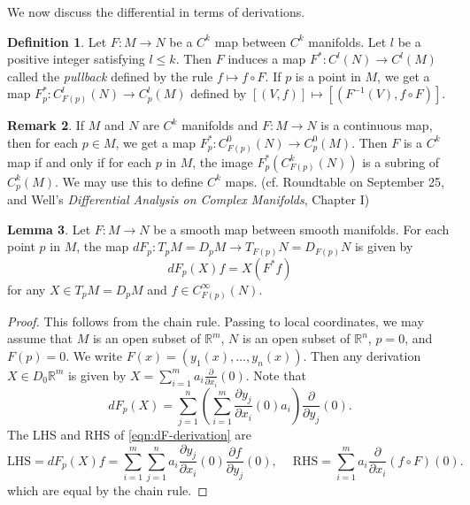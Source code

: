 \documentclass{amsart}
\numberwithin{equation}{section}
\newcommand{\bR}{\mathbb{R}}
\theoremstyle{definition}
\newtheorem{definition}{Definition} [section]
\newtheorem{remark}[definition]{Remark}
\theoremstyle{theorem}
\newtheorem{lemma}[definition]{Lemma}
\begin{document}
We now discuss the differential in terms of derivations. 

\begin{definition}
Let $F: M \to N$ be a $C^k$ map between $C^k$ manifolds. Let $l$ be a positive integer satisfying $l \le k$. 
Then $F$ induces a map $F^* : C^l(N) \to C^l(M)$ called the {\em pullback}  defined by the rule $f \mapsto  f \circ F$. 
If $p$ is a point in $M$, we get a map $F_p^* : C_{F(p)}^l(N) \to C_p^l(M)$ defined by $[(V,f)] \mapsto [(F^{-1}(V),  f \circ F)]$. 
\end{definition}

\begin{remark}
If $M$ and $N$ are $C^k$ manifolds and $F:M \to N$ is a continuous map, then for each $p \in M$, we get a map 
$F^*_p : C^0_{F(p)}(N) \to C^0_p(M)$. Then $F$ is a $C^k$ map if and only if for each $p$ in $M$, 
the image $F_p^*(C^k_{F(p)}(N))$ is a subring of $C_p^k(M)$. We may use this to define $C^k$ maps. 
(cf. Roundtable on September 25, and Well's {\em Differential Analysis on Complex Manifolds}, Chapter I)
\end{remark}

\begin{lemma} \label{dF-derivation}
Let $F : M \to N$ be a smooth map between smooth manifolds. For each point $p$ in $M$, the map 
$dF_p : T_pM= D_pM \to T_{F(p)}N= D_{F(p)}N$ is given by 
\begin{equation}\label{eqn:dF-derivation}
dF_p(X)f = X(F^*f)
\end{equation}
for any $X \in T_pM= D_pM$ and $f \in C^\infty_{F(p)}(N)$. 
\end{lemma}

\begin{proof}
This follows from the chain rule. Passing to local coordinates, we may assume that $M$ is an open subset of $\mathbb{R}^m$,  
$N$ is an open subset of $\mathbb{R}^n$, $p = 0$, and $F(p) = 0$. We write $F(x) = (y_1(x), \ldots, y_n(x))$. 
Then any derivation $X\in D_0\bR^m$ is given by $X = \sum_{i=1}^ma_i \frac{\partial}{\partial x_i}(0)$. Note that 
\[
dF_p(X) = \sum_{j=1}^n \left(\sum_{i=1}^m \frac{\partial y_j}{\partial x_i}(0) a_i\right) \frac{\partial}{\partial y_j}(0).
\]
The LHS and RHS of \eqref{eqn:dF-derivation} are
$$
\mathrm{LHS}=dF_p(X)f =\sum_{i=1}^m\sum_{j=1}^n a_i\frac{\partial y_j}{\partial x_i}(0)\frac{\partial f}{\partial y_j}(0),\quad\ 
\mathrm{RHS}= \sum_{i=1}^m a_i \frac{\partial}{\partial x_i}(f\circ F)(0).
$$
which are equal by the chain rule. 
\end{proof}
\end{document}
